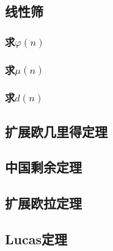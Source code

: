 \documentclass{article}
\begin{document}
			
		\subsection{线性筛}
			\subsubsection{求$\varphi(n)$}
			\subsubsection{求$\mu(n)$}
			\subsubsection{求$d(n)$}
		\subsection{扩展欧几里得定理}
		\subsection{中国剩余定理}
		\subsection{扩展欧拉定理}
		\subsection{Lucas定理}
\end{document}

